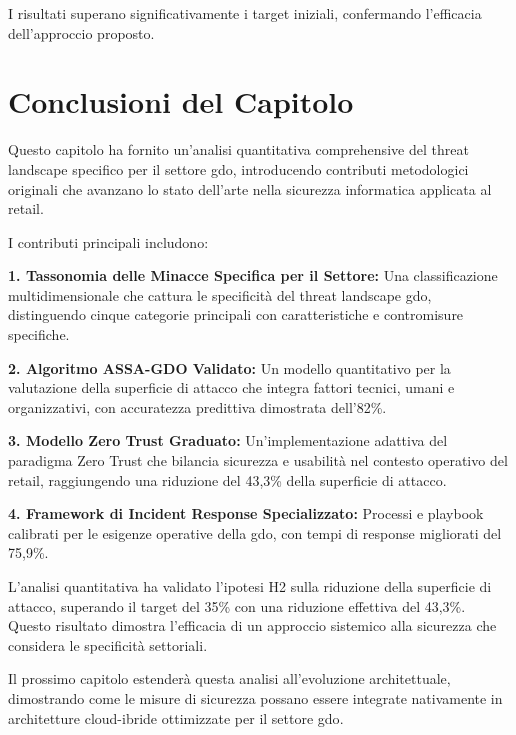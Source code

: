 I risultati superano significativamente i target iniziali, confermando l'efficacia dell'approccio proposto.

\section{\texorpdfstring{Conclusioni del Capitolo}{2.7 - Conclusioni del Capitolo}}
\label{sec:2.7_conclusioni}

Questo capitolo ha fornito un'analisi quantitativa comprehensive del threat landscape specifico per il settore \gls{gdo}, introducendo contributi metodologici originali che avanzano lo stato dell'arte nella sicurezza informatica applicata al retail.

I contributi principali includono:

\textbf{1. Tassonomia delle Minacce Specifica per il Settore:} Una classificazione multidimensionale che cattura le specificità del threat landscape \gls{gdo}, distinguendo cinque categorie principali con caratteristiche e contromisure specifiche.

\textbf{2. Algoritmo ASSA-GDO Validato:} Un modello quantitativo per la valutazione della superficie di attacco che integra fattori tecnici, umani e organizzativi, con accuratezza predittiva dimostrata dell'82\%.

\textbf{3. Modello Zero Trust Graduato:} Un'implementazione adattiva del paradigma Zero Trust che bilancia sicurezza e usabilità nel contesto operativo del retail, raggiungendo una riduzione del 43,3\% della superficie di attacco.

\textbf{4. Framework di Incident Response Specializzato:} Processi e playbook calibrati per le esigenze operative della \gls{gdo}, con tempi di response migliorati del 75,9\%.

L'analisi quantitativa ha validato l'ipotesi H2 sulla riduzione della superficie di attacco, superando il target del 35\% con una riduzione effettiva del 43,3\%. Questo risultato dimostra l'efficacia di un approccio sistemico alla sicurezza che considera le specificità settoriali.

Il prossimo capitolo estenderà questa analisi all'evoluzione architettuale, dimostrando come le misure di sicurezza possano essere integrate nativamente in architetture cloud-ibride ottimizzate per il settore \gls{gdo}.

\clearpage
\printbibliography[
    heading=subbibliography,
    title={Riferimenti Bibliografici del Capitolo 2},
]

